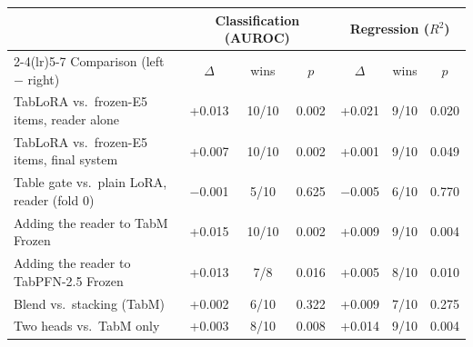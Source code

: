 \begin{tabular}{@{}lcccccc@{}}
\toprule
 & \multicolumn{3}{c}{Classification (AUROC)} & \multicolumn{3}{c}{Regression ($R^2$)} \\
\cmidrule(lr){2-4}\cmidrule(lr){5-7}
Comparison (left $-$ right) & $\Delta$ & wins & $p$ & $\Delta$ & wins & $p$ \\
\midrule
TabLoRA vs.\ frozen-E5 items, reader alone & +0.013 & 10/10 & 0.002 & +0.021 & 9/10 & 0.020 \\
TabLoRA vs.\ frozen-E5 items, final system & +0.007 & 10/10 & 0.002 & +0.001 & 9/10 & 0.049 \\
Table gate vs.\ plain LoRA, reader (fold 0) & $-$0.001 & 5/10 & 0.625 & $-$0.005 & 6/10 & 0.770 \\
Adding the reader to TabM Frozen & +0.015 & 10/10 & 0.002 & +0.009 & 9/10 & 0.004 \\
Adding the reader to TabPFN-2.5 Frozen & +0.013 & 7/8 & 0.016 & +0.005 & 8/10 & 0.010 \\
Blend vs.\ stacking (TabM) & +0.002 & 6/10 & 0.322 & +0.009 & 7/10 & 0.275 \\
Two heads vs.\ TabM only & +0.003 & 8/10 & 0.008 & +0.014 & 9/10 & 0.004 \\
\bottomrule
\end{tabular}
